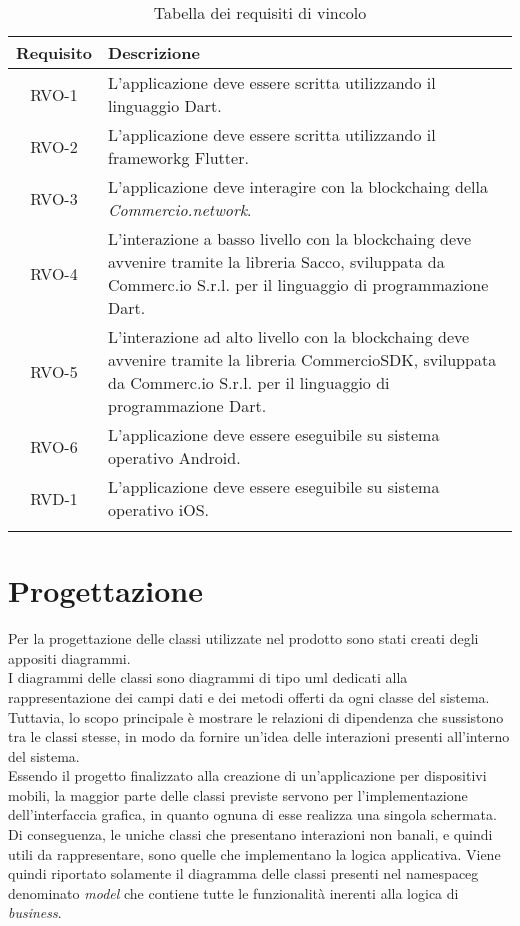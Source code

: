 \begin{longtable}{|c|p{10.5cm}|}
	\hline
	\rowcolor{gray}
	\textbf{Requisito} & \textbf{Descrizione} \\
	\hline
	RVO-1    & L'applicazione deve essere scritta utilizzando il linguaggio Dart. \\
	\hline
	RVO-2    & L'applicazione deve essere scritta utilizzando il \gls{frameworkg} Flutter. \\
	\hline
	RVO-3    & L'applicazione deve interagire con la \gls{blockchaing} della \textit{Commercio.network}. \\
	\hline
	RVO-4    & L'interazione a basso livello con la \gls{blockchaing} deve avvenire tramite la libreria Sacco, sviluppata da Commerc.io S.r.l. per il linguaggio di programmazione Dart. \\
	\hline
	RVO-5    & L'interazione ad alto livello con la \gls{blockchaing} deve avvenire tramite la libreria CommercioSDK, sviluppata da Commerc.io S.r.l. per il linguaggio di programmazione Dart. \\
	\hline
	RVO-6    & L'applicazione deve essere eseguibile su sistema operativo Android. \\
	\hline
	RVD-1    & L'applicazione deve essere eseguibile su sistema operativo iOS. \\
	\hline
	
	\caption{Tabella dei requisiti di vincolo}
	\label{tab:requisiti-vincolo}
\end{longtable}
	

\section{Progettazione}

Per la progettazione delle classi utilizzate nel prodotto sono stati creati degli appositi diagrammi.\\
I diagrammi delle classi sono diagrammi di tipo \gls{uml}\glsfirstoccur{} dedicati alla rappresentazione dei campi dati e dei metodi offerti da ogni classe del sistema. Tuttavia, lo scopo principale è mostrare le relazioni di dipendenza che sussistono tra le classi stesse, in modo da fornire un'idea delle interazioni presenti all'interno del sistema.\\
Essendo il progetto finalizzato alla creazione di un'applicazione per dispositivi mobili, la maggior parte delle classi previste servono per l'implementazione dell'interfaccia grafica, in quanto ognuna di esse realizza una singola schermata. Di conseguenza, le uniche classi che presentano interazioni non banali, e quindi utili da rappresentare, sono quelle che implementano la logica applicativa. Viene quindi riportato solamente il diagramma delle classi presenti nel \gls{namespaceg}\glsfirstoccur{} denominato \textit{model} che contiene tutte le funzionalità inerenti alla logica di \textit{business}.

